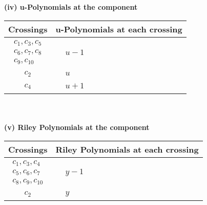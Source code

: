 \documentclass[1p]{elsarticle_modified}
\theoremstyle{definition}
\begin{document}
\newpage\renewcommand{\arraystretch}{1}
\flushleft \textbf{(iv) u-Polynomials at the component}\newline \\
\begin{tabular}{m{50pt}|m{274pt}}
Crossings & \hspace{64pt}u-Polynomials at each crossing \\
\hline $$\begin{aligned}c_{1},c_{3},c_{5}\\c_{6},c_{7},c_{8}\\c_{9},c_{10}\end{aligned}$$&$\begin{aligned}
&u-1
\end{aligned}$\\
\hline $$\begin{aligned}c_{2}\end{aligned}$$&$\begin{aligned}
&u
\end{aligned}$\\
\hline $$\begin{aligned}c_{4}\end{aligned}$$&$\begin{aligned}
&u+1
\end{aligned}$\\
\hline
\end{tabular}\\~\\
\newpage\renewcommand{\arraystretch}{1}
\flushleft \textbf{(v) Riley Polynomials at the component}\newline \\
\begin{tabular}{m{50pt}|m{274pt}}
Crossings & \hspace{64pt}Riley Polynomials at each crossing \\
\hline $$\begin{aligned}c_{1},c_{3},c_{4}\\c_{5},c_{6},c_{7}\\c_{8},c_{9},c_{10}\end{aligned}$$&$\begin{aligned}
&y-1
\end{aligned}$\\
\hline $$\begin{aligned}c_{2}\end{aligned}$$&$\begin{aligned}
&y
\end{aligned}$\\
\hline
\end{tabular}\\~\\
\end{document}
